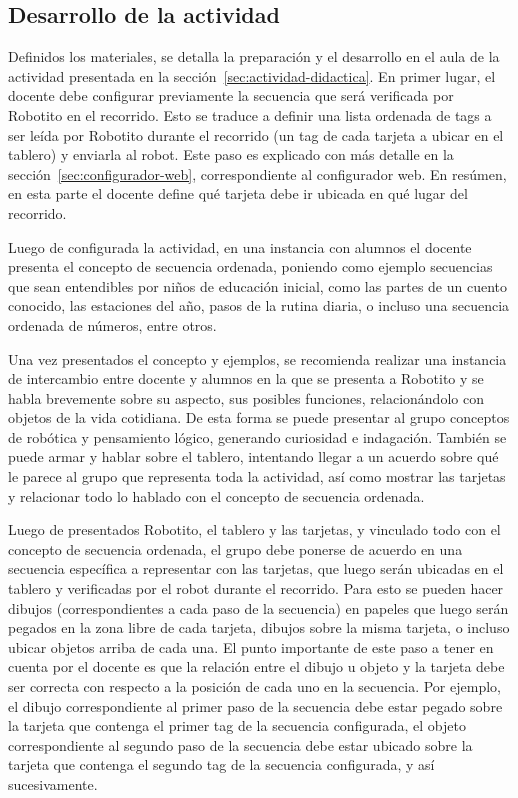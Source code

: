 \documentclass{prgrado}
\begin{document}
\subsection{Desarrollo de la actividad}

Definidos los materiales, se detalla la preparación y el desarrollo en el aula de la actividad presentada en la sección~\ref{sec:actividad-didactica}. En primer lugar, el docente debe configurar previamente la secuencia que será verificada por Robotito en el recorrido. Esto se traduce a definir una lista ordenada de tags a ser leída por Robotito durante el recorrido (un tag de cada tarjeta a ubicar en el tablero) y enviarla al robot. Este paso es explicado con más detalle en la sección~\ref{sec:configurador-web}, correspondiente al configurador web. En resúmen, en esta parte el docente define qué tarjeta debe ir ubicada en qué lugar del recorrido.

Luego de configurada la actividad, en una instancia con alumnos el docente presenta el concepto de secuencia ordenada, poniendo como ejemplo secuencias que sean entendibles por niños de educación inicial, como las partes de un cuento conocido, las estaciones del año, pasos de la rutina diaria, o incluso una secuencia ordenada de números, entre otros.

Una vez presentados el concepto y ejemplos, se recomienda realizar una instancia de intercambio entre docente y alumnos en la que se presenta a Robotito y se habla brevemente sobre su aspecto, sus posibles funciones, relacionándolo con objetos de la vida cotidiana. De esta forma se puede presentar al grupo conceptos de robótica y pensamiento lógico, generando curiosidad e indagación. También se puede armar y hablar sobre el tablero, intentando llegar a un acuerdo sobre qué le parece al grupo que representa toda la actividad, así como mostrar las tarjetas y relacionar todo lo hablado con el concepto de secuencia ordenada. 

Luego de presentados Robotito, el tablero y las tarjetas, y vinculado todo con el concepto de secuencia ordenada, el grupo debe ponerse de acuerdo en una secuencia específica a representar con las tarjetas, que luego serán ubicadas en el tablero y verificadas por el robot durante el recorrido. Para esto se pueden hacer dibujos (correspondientes a cada paso de la secuencia) en papeles que luego serán pegados en la zona libre de cada tarjeta, dibujos sobre la misma tarjeta, o incluso ubicar objetos arriba de cada una. El punto importante de este paso a tener en cuenta por el docente es que la relación entre el dibujo u objeto y la tarjeta debe ser correcta con respecto a la posición de cada uno en la secuencia. Por ejemplo, el dibujo correspondiente al primer paso de la secuencia debe estar pegado sobre la tarjeta que contenga el primer tag de la secuencia configurada, el objeto correspondiente al segundo paso de la secuencia debe estar ubicado sobre la tarjeta que contenga el segundo tag de la secuencia configurada, y así sucesivamente.
\end{document}
